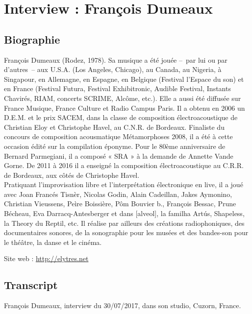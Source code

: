 \chapter{Interview : François Dumeaux}
\label{appendix:dumeaux}

\section*{Biographie}
\noindent François Dumeaux (Rodez, 1978). Sa musique a été jouée --~par lui ou par d’autres~-- aux U.S.A. (Los Angeles, Chicago), au Canada, au Nigeria, à Singapour, en Allemagne, en Espagne, en Belgique (Festival l’Espace du son) et en France (Festival Futura, Festival Exhibitronic, Audible Festival, Instants Chavirés, RIAM, concerts SCRIME, Alcôme, etc.).
 Elle a aussi été diffusée sur France Musique, France Culture et Radio Campus Paris. Il a obtenu en 2006 un D.E.M. et le prix SACEM, dans la classe de composition électroacoustique de Christian Eloy et Christophe Havel, au C.N.R. de Bordeaux. Finaliste du concours de composition acousmatique Métamorphoses 2008, il a été à cette occasion édité sur la compilation éponyme. Pour le 80ème anniversaire de Bernard Parmegiani, il a composé « SRA » à la demande de Annette Vande Gorne. De 2011 à 2016 il a enseigné la composition électroacoustique au C.R.R. de Bordeaux, aux côtés de Christophe Havel.\\
 \indent Pratiquant l’improvisation libre et l’interprétation électronique en live, il a joué avec Joan Francés Tisnèr, Nicolas Godin, Alain Cadeillan, Jakes Aymonino, Christian Vieussens, Peìre Boissière, Pôm Bouvier b., François Bessac, Prune Bécheau, Eva Darracq-Antesberger et dans [alveol], la familha Artús, Shapeless, la Theory du Reptil, etc. Il réalise par ailleurs des créations radiophoniques, des documentaires sonores, de la sonographie pour les musées et des bandes-son pour le théâtre, la danse et le cinéma.

\noindent Site web : \url{http://elytres.net}

\section*{Transcript}

\noindent François Dumeaux, interview du 30/07/2017, dans son studio, Cuzorn, France.


